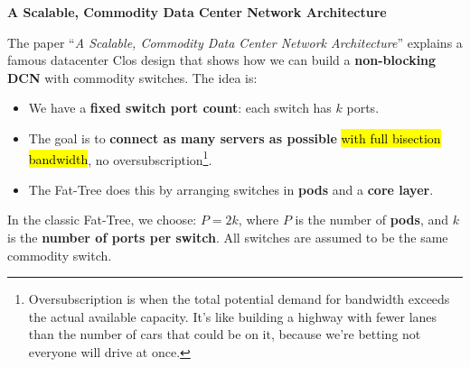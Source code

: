\highspace
\begin{flushleft}
    \textcolor{Green3}{ \textbf{A Scalable, Commodity Data Center Network Architecture \cite{al2008scalable}}}
\end{flushleft}
The paper ``\emph{A Scalable, Commodity Data Center Network Architecture}''\cite{al2008scalable} explains a famous datacenter Clos design that shows how we can build a \textbf{non-blocking DCN} with commodity switches. The idea is:
\begin{itemize}
    \item We have a \textbf{fixed switch port count}: each switch has $k$ ports.
    \item The goal is to \textbf{connect as many servers as possible} \hl{with full bisection bandwidth}, no oversubscription\footnote{Oversubscription is when the total potential demand for bandwidth exceeds the actual available capacity. It's like building a highway with fewer lanes than the number of cars that could be on it, because we're betting not everyone will drive at once.}.
    \item The Fat-Tree does this by arranging switches in \textbf{pods} and a \textbf{core layer}.
\end{itemize}
In the classic Fat-Tree, we choose: $ P = 2k $, where $P$ is the number of \textbf{pods}, and $k$ is the \textbf{number of ports per switch}. All switches are assumed to be the same commodity switch.

